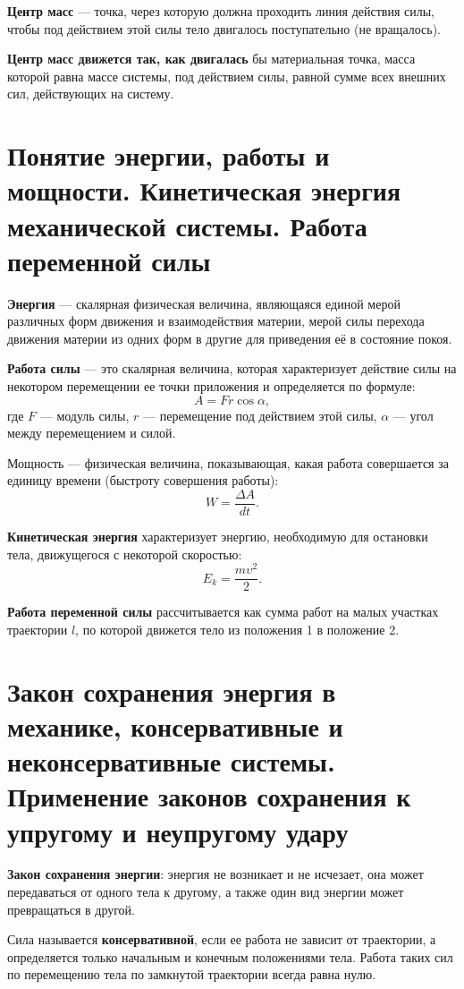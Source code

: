 \documentclass[10pt]{scrbook}
\begin{document}
\textbf{Центр масс} --- точка, через которую должна проходить линия действия
силы, чтобы под действием этой силы тело двигалось поступательно (не
вращалось).

\textbf{Центр масс движется так, как двигалась} бы материальная точка, масса
которой равна массе системы, под действием силы, равной сумме всех внешних сил,
действующих на систему.

\section[четвёртый вопрос]{Понятие энергии, работы и мощности. Кинетическая
  энергия механической системы. Работа переменной силы}

\textbf{Энергия} — скалярная физическая величина, являющаяся единой мерой
различных форм движения и взаимодействия материи, мерой силы перехода движения
материи из одних форм в другие для приведения её в состояние покоя.

\textbf{Работа силы} --- это скалярная величина, которая характеризует действие
силы на некотором перемещении ее точки приложения и определяется по формуле: \[
	A = F r \cos{\alpha}
	,\] где $F$ --- модуль силы, $r$ --- перемещение под действием этой силы,
$\alpha$ --- угол между перемещением и силой.

Мощность — физическая величина, показывающая, какая работа совершается за
единицу времени (быстроту совершения работы): \[
	W = \frac{\Delta A}{dt}
	.\]

\textbf{Кинетическая энергия} характеризует энергию, необходимую для остановки тела, движущегося с некоторой скоростью: \[
	E_k = \frac{m \upsilon^2}{2}
	.\]

\textbf{Работа переменной силы} рассчитывается как сумма работ на малых
участках траектории $l$, по которой движется тело из положения 1 в положение 2.

\section[пятый вопрос]{Закон сохранения энергия в механике, консервативные и
  неконсервативные системы. Применение законов сохранения к упругому и
  неупругому удару}

\textbf{Закон сохранения энергии}: энергия не возникает и не исчезает, она
может передаваться от одного тела к другому, а также один вид энергии может
превращаться в другой.

Сила называется \textbf{консервативной}, если ее работа не зависит от
траектории, а определяется только начальным и конечным положениями тела. Работа
таких сил по перемещению тела по замкнутой траектории всегда равна нулю.
\end{document}
